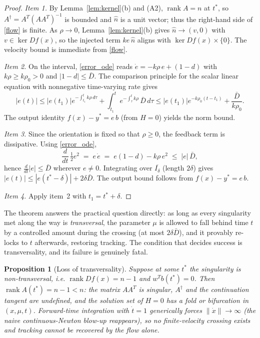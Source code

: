 \documentclass[11pt,american]{article}
\DeclareMathOperator{\rank}{\operatorname{rank}}
\newtheorem{proposition}{Proposition}
\theoremstyle{definition}
\theoremstyle{plain}
\theoremstyle{remark}
\begin{document}
\begin{proof}
\emph{Item 1.} By Lemma~\ref{lem:kernel}(b) and (A2), $\rank A = n$ at $t^*$, so $A^\dagger = A^T(AA^T)^{-1}$ is bounded and $\hat n$ is a unit vector; thus the right-hand side of \eqref{flow} is finite. As $\rho \to 0$, Lemma~\ref{lem:kernel}(b) gives $\hat n \to (v, 0)$ with $v \in \ker Df(x)$, so the injected term $ke\,\hat n$ aligns with $\ker Df(x) \times \{0\}$. The velocity bound is immediate from \eqref{flow}.

\emph{Item 2.} On the interval, \eqref{error_ode} reads $\dot e = -k\rho\, e + (1-d)$ with $k\rho \ge k\rho_0 > 0$ and $|1-d| \le \bar D$. The comparison principle for the scalar linear equation with nonnegative time-varying rate gives
\[
|e(t)| \le |e(t_1)| e^{-\int_{t_1}^t k\rho\, d\tau} + \int_{t_1}^t e^{-\int_\tau^t k\rho}\,\bar D\, d\tau \le |e(t_1)| e^{-k\rho_0 (t-t_1)} + \frac{\bar D}{k\rho_0}.
\]
The output identity $f(x) - y^* = e\, b$ (from $H = 0$) yields the norm bound.

\emph{Item 3.} Since the orientation is fixed so that $\rho \ge 0$, the feedback term is dissipative. Using \eqref{error_ode},
\[
\frac{d}{dt}\,\tfrac{1}{2} e^2 \;=\; e\,\dot e \;=\; e(1-d) - k\rho\, e^2 \;\le\; |e|\,\bar D ,
\]
hence $\frac{d}{dt}|e| \le \bar D$ wherever $e \ne 0$. Integrating over $\overline{I_\delta}$ (length $2\delta$) gives $|e(t)| \le |e(t^*-\delta)| + 2\delta\bar D$. The output bound follows from $f(x)-y^* = e\, b$.

\emph{Item 4.} Apply item~2 with $t_1 = t^*+\delta$.
\end{proof}

The theorem answers the practical question directly: as long as every singularity met along the way is \emph{transversal}, the parameter $\mu$ is allowed to fall behind time $t$ by a controlled amount during the crossing (at most $2\delta \bar D$), and it provably re-locks to $t$ afterwards, restoring tracking. The condition that decides success is transversality, and its failure is genuinely fatal.

\begin{proposition}[Loss of transversality]\label{prop:failure}
Suppose at some $t^*$ the singularity is non-transversal, i.e. $\rank Df(x) = n-1$ and $w^T b(t^*) = 0$. Then $\rank A(t^*) = n-1 < n$: the matrix $A A^T$ is singular, $A^\dagger$ and the continuation tangent are undefined, and the solution set of $H = 0$ has a fold or bifurcation in $(x,\mu,t)$. Forward-time integration with $\dot t = 1$ generically forces $\|\dot x\| \to \infty$ (the naive continuous-Newton blow-up reappears), so no finite-velocity crossing exists and tracking cannot be recovered by the flow alone.
\end{proposition}
\end{document}
